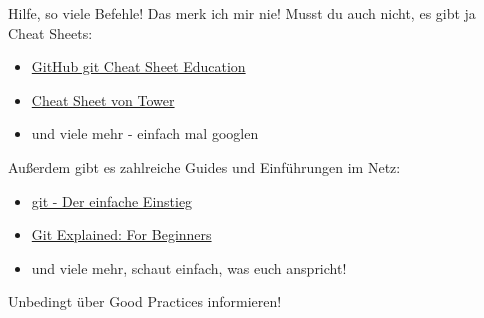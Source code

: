 \begin{frame}{Hilfe, so viele Befehle! Das merk ich mir nie!}
	Musst du auch nicht, es gibt ja Cheat Sheets:
	\begin{itemize}
		\item \href{https://education.github.com/git-cheat-sheet-education.pdf}{GitHub git Cheat Sheet Education}
		\item \href{https://www.git-tower.com/blog/git-cheat-sheet/}{Cheat Sheet von Tower}
		\item und viele mehr - einfach mal googlen
	\end{itemize}
	Außerdem gibt es zahlreiche Guides und Einführungen im Netz:
	\begin{itemize}
		\item \href{https://rogerdudler.github.io/git-guide/index.de.html}{git - Der einfache Einstieg}
		\item \href{http://juristr.com/blog/2013/04/git-explained/}{Git Explained: For Beginners}
		\item und viele mehr, schaut einfach, was euch anspricht!
	\end{itemize}
	\begin{description}[Tipp:]
		\item[\alert{Tipp:}] Unbedingt über Good Practices informieren!
	\end{description}
\end{frame}


%
%
%
%
%
%
%



